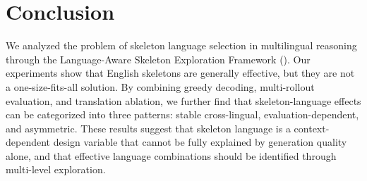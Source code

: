 \section{Conclusion}

We analyzed the problem of skeleton language selection in multilingual reasoning through the Language-Aware Skeleton Exploration Framework (\Lasef). Our experiments show that English skeletons are generally effective, but they are not a one-size-fits-all solution. By combining greedy decoding, multi-rollout evaluation, and translation ablation, we further find that skeleton-language effects can be categorized into three patterns: stable cross-lingual, evaluation-dependent, and asymmetric. These results suggest that skeleton language is a context-dependent design variable that cannot be fully explained by generation quality alone, and that effective language combinations should be identified through multi-level exploration.